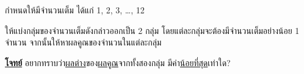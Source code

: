 \question{}

กำหนดให้มีจำนวนเต็ม ได้แก่ 1, 2, 3, \ldots, 12 

ให้แบ่งกลุ่มของจำนวนเต็มดังกล่าวออกเป็น 2 กลุ่ม\; โดยแต่ละกลุ่มจะต้องมีจำนวนเต็มอย่างน้อย 1 จำนวน\; 
จากนั้นให้หาผลคูณของจำนวนในแต่ละกลุ่ม

\medskip\noindent
\textbf{\uline{โจทย์}} อยากทราบว่า\hrsp\uline{ผลต่าง}ของ\uline{ผลคูณ}จากทั้งสองกลุ่ม 
มีค่า\uline{น้อยที่สุด}เท่าใด?
